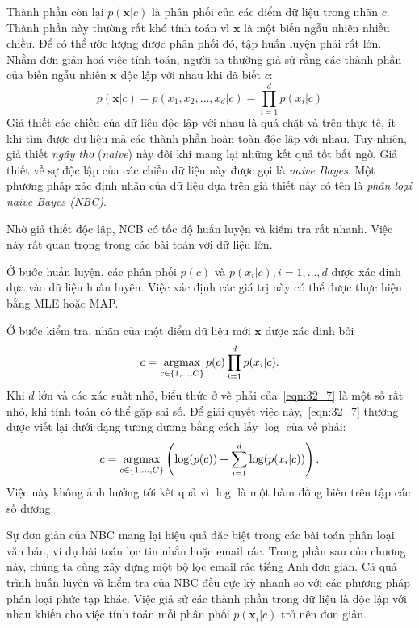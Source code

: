 Thành phần còn lại $p(\mathbf{x} | c)$ là phân phối của các điểm dữ liệu trong
nhãn $c$. Thành phần này thường rất khó tính toán vì $\mathbf{x}$ là một biến
ngẫu nhiên nhiều chiều. Để có thể ước lượng được phân phối đó, tập huấn luyện
phải rất lớn. Nhằm đơn giản hoá việc tính toán, người ta thường giả sử
rằng các thành phần của biến ngẫu nhiên $\mathbf{x}$ độc lập với nhau khi đã
biết $c$:
\begin{equation}
\label{eqn:32_6}
p(\mathbf{x} | c) = p(x_1, x_2, \dots, x_d | c) =  \prod_{i = 1}^d p(x_i | c)
\end{equation}
Giả thiết các chiều của dữ liệu độc lập với nhau là quá chặt và trên thực tế, ít
khi tìm được dữ liệu mà các thành phần hoàn toàn độc lập với nhau. Tuy nhiên,
giả thiết \textit{ngây thơ} (\textit{naive}) này đôi khi mang lại những kết quả
tốt bất ngờ. Giả thiết về sự độc lập của các chiều dữ liệu này được gọi là
\textit{naive Bayes}. Một phương pháp xác định nhãn của dữ liệu dựa trên giả
thiết này có tên là \textit{phân loại naive Bayes (NBC)}.

Nhờ giả thiết độc lập, NCB có tốc độ huấn luyện và
kiểm tra rất nhanh. Việc này rất quan trọng trong các bài toán với dữ liệu lớn.

Ở bước huấn luyện, các phân phối $p(c)$ và $p(x_i | c), i = 1, \dots, d$ được xác định dựa vào dữ liệu huấn luyện. Việc xác định các giá trị này có thể được thực hiện bằng MLE hoặc MAP.

Ở bước kiểm tra, nhãn của một điểm dữ liệu mới $\mathbf{x}$ được xác đinh bởi
\begin{equation}
\label{eqn:32_7}
c = \operatorname*{argmax}_{c \in \{1, \dots, C\}} p(c) \prod_{i=1}^d p(x_i | c).
\end{equation}
Khi $d$ lớn và các xác suất nhỏ, biểu thức ở vế phải của~\eqref{eqn:32_7} là một
số rất nhỏ, khi tính toán có thể gặp sai số. Để giải quyết việc
này,~\eqref{eqn:32_7} thường được viết lại dưới dạng tương đương bằng cách lấy
$\log$ của vế phải:
\begin{equation}
\label{eqn:32_7_1}
c = \operatorname*{argmax}_{c \in \{1, \dots, C\}} \left(\log(p(c)) + \sum_{i=1}^d \log(p(x_i
| c))\right).
\end{equation}
Việc này không ảnh hưởng tới kết quả vì $\log$ là một hàm đồng biến trên tập các số dương.

Sự đơn giản của NBC mang lại hiệu quả đặc biệt trong các bài toán phân loại văn
bản, ví dụ bài toán lọc tin nhắn hoặc email rác. Trong phần sau của
chương này, chúng ta cùng xây dựng một bộ lọc email rác tiếng Anh đơn giản.
Cả quá trình huấn luyện và kiểm tra của NBC đều cực kỳ nhanh so với các phương
pháp phân loại phức tạp khác. Việc giả sử các thành phần trong dữ liệu là độc
lập với nhau khiến cho việc tính toán mỗi phân phối $p(\mathbf{x}_i|c)$ trở nên đơn giản.

